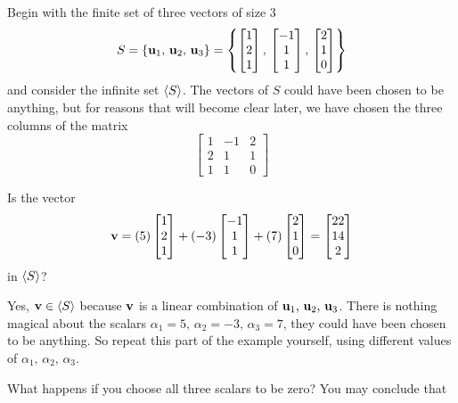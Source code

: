 \documentclass{ximera}
\begin{document}
\begin{example}
  Begin with the finite set of three vectors of size $3$
  \[
    S=\{\mathbf{u}_1,\,\mathbf{u}_2,\,\mathbf{u}_3\}
    =\left\{
      \begin{bmatrix}1\\2\\1\end{bmatrix},\,\begin{bmatrix}-1\\1\\1\end{bmatrix},\,\begin{bmatrix}2\\1\\0\end{bmatrix}
    \right\}
  \]
  and consider the infinite set $\left\langle S\right\rangle$.  The vectors of $S$ could
  have been chosen to be anything, but for reasons that will become
  clear later, we have chosen the three columns of the matrix
  \[
    \begin{bmatrix}
      1 & -1 & 2 \\
      2 & 1 & 1 \\
      1 & 1 & 0 
    \end{bmatrix}
  \]

  \begin{question}
    Is the vector
    \[
      \mathbf{v}=(5)\begin{bmatrix}1\\2\\1\end{bmatrix}+(-3)\begin{bmatrix}-1\\1\\1\end{bmatrix}+(7)\begin{bmatrix}2\\1\\0\end{bmatrix}=
      \begin{bmatrix}22\\14\\2\end{bmatrix}
    \]
    in $\left\langle S\right\rangle$?

    \begin{multipleChoice}
    \end{multipleChoice}

    \begin{feedback}[correct]
      Yes, $\mathbf{v} \in \left\langle S\right\rangle$ because $\mathbf{v}$ is a linear
      combination of $\mathbf{u}_1,\,\mathbf{u}_2,\,\mathbf{u}_3$.  There is
      nothing magical about the scalars
      $\alpha_1=5,\,\alpha_2=-3,\,\alpha_3=7$, they could have been
      chosen to be anything.  So repeat this part of the example
      yourself, using different values of
      $\alpha_1,\,\alpha_2,\,\alpha_3$.

      What happens if you choose all three scalars to be zero?  You
      may conclude that
      \begin{multipleChoice}
      \end{multipleChoice} 
    \end{feedback}
  \end{question}


\end{example}
\end{document}

